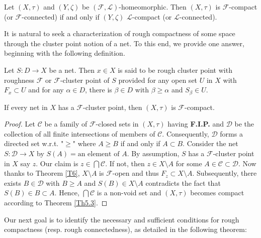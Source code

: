 \documentclass[11pt]{amsart}
\begin{document}
\begin{corollary}
     Let $(X,\tau)$ and $(Y,\zeta)$ be $(\mathscr{F},\mathscr{L})$-homeomorphic. Then $(X,\tau)$ is $\mathscr{F}$-compact (or $\mathscr{F}$-connected) if and only if $(Y,\zeta)$ $\mathscr{L}$-compact (or $\mathscr{L}$-connected).
\end{corollary}



It is natural to seek a characterization of rough compactness of some space through the cluster point notion of a net. To this end, we provide one answer, beginning with the following definition.

\begin{definition}
    Let $S: D\to X$ be a net. Then $x\in X$ is said to be rough cluster point with roughness $\mathscr{F}$ or $\mathscr{F}$-cluster point of $S$ provided for any open set $U$ in $X$ with $F_x\subset U$ and for any $\alpha\in D$, there is $\beta\in D$ with $\beta\geq \alpha$ and $S_\beta\in U$.
    \end{definition}

\begin{theorem}
 If every net in $X$ has a $\mathscr{F}$-cluster point, then $(X,\tau)$ is $\mathscr{F}$-compact.
\end{theorem}

\begin{proof}
Let $\mathscr{C}$ be a family of $\mathscr{F}$-closed sets in $(X,\tau)$ having \textbf{F.I.P.} and $\mathscr{D}$ be the collection of all finite intersections of members of $\mathscr{C}$. Consequently, $\mathscr{D}$ forms a directed set w.r.t. "$\geq$" where $A\geq B$ if and only if $A\subset B$. Consider the net $S: \mathscr{D}\to X$ by $S(A)= \text{an element of } A$. By assumption, $S$ has a  $\mathscr{F}$-cluster point in $X$ say $z$. Our claim is $z\in \bigcap \mathscr{C}$. If not, then $z\in X\setminus A$ for some $A\in \mathscr{C}\subset \mathscr{D}$. Now thanks to Theorem \ref{T6}, $X\setminus A$ is $\mathscr{F}$-open and thus $F_z\subset X\setminus A$. Subsequently, there exists $B\in \mathscr{D}$ with $B\geq A$ and $S(B)\in X\setminus A$ contradicts the fact that $S(B)\in B\subset A$. Hence, $\bigcap \mathscr{C}$ is a non-void set and $(X,\tau)$ becomes compact according to Theorem \ref{Th5.3}.
\end{proof}

Our next goal is to identify the necessary and sufficient conditions for rough compactness (resp. rough connectedness), as detailed in the following theorem:
\end{document}

